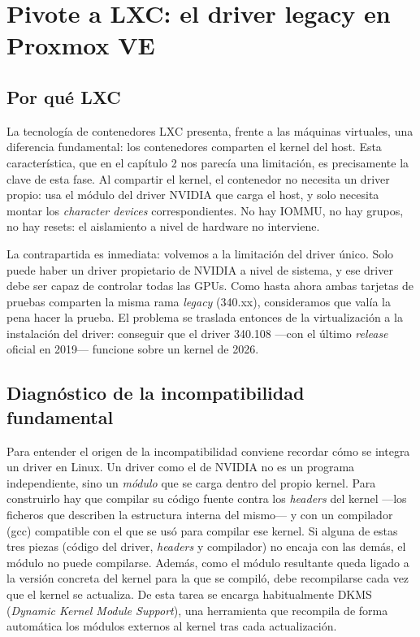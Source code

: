 \chapter{Pivote a LXC: el driver legacy en Proxmox VE} \label{cap3}

\section{Por qué LXC}

La tecnología de contenedores LXC presenta, frente a las máquinas virtuales, una diferencia fundamental:
 los contenedores comparten el kernel del host. Esta característica, que en el capítulo 2 nos parecía 
 una limitación, es precisamente la clave de esta fase. Al compartir el kernel, el contenedor no 
 necesita un driver propio: usa el módulo del driver NVIDIA que carga el host, y solo necesita montar
 los \textit{character devices} correspondientes. No hay IOMMU, no hay grupos, no hay 
 resets: el aislamiento a nivel de hardware no interviene.

La contrapartida es inmediata: volvemos a la limitación del driver único. Solo puede haber un driver
propietario de NVIDIA a nivel de sistema, y ese driver debe ser capaz de controlar todas las GPUs. 
Como hasta ahora ambas tarjetas de pruebas comparten la misma rama \textit{legacy} (340.xx), 
consideramos que valía la pena hacer la prueba. El problema se traslada entonces de la virtualización a 
la instalación del driver: conseguir que el driver 340.108 ---con el último \textit{release} oficial en 2019--- 
funcione sobre un kernel de 2026.

\section{Diagnóstico de la incompatibilidad fundamental} \label{sec:cap3-diagnostico}

Para entender el origen de la incompatibilidad conviene recordar cómo se integra un driver en Linux. Un driver como el de NVIDIA no es un programa independiente, sino un \textit{módulo} que se carga dentro del propio kernel. Para construirlo hay que compilar su código fuente contra los \textit{headers} del kernel ---los ficheros que describen la estructura interna del mismo--- y con un compilador (gcc) compatible con el que se usó para compilar ese kernel. Si alguna de estas tres piezas (código del driver, \textit{headers} y compilador) no encaja con las demás, el módulo no puede compilarse. Además, como el módulo resultante queda ligado a la versión concreta del kernel para la que se compiló, debe recompilarse cada vez que el kernel se actualiza. De esta tarea se encarga habitualmente DKMS (\textit{Dynamic Kernel Module Support}), una herramienta que recompila de forma automática los módulos externos al kernel tras cada actualización.

